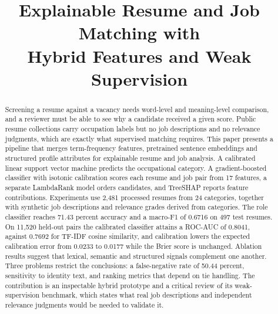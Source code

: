 \documentclass[conference]{IEEEtran}
\begin{document}
\title{Explainable Resume and Job Matching with\\Hybrid Features and Weak Supervision}

\author{
\and
{}
}

\maketitle

\begin{abstract}
Screening a resume against a vacancy needs word-level and meaning-level comparison, and a reviewer must be able to see why a candidate received a given score. Public resume collections carry occupation labels but no job descriptions and no relevance judgments, which are exactly what supervised matching requires. This paper presents a pipeline that merges term-frequency features, pretrained sentence embeddings and structured profile attributes for explainable resume and job analysis. A calibrated linear support vector machine predicts the occupational category. A gradient-boosted classifier with isotonic calibration scores each resume and job pair from 17 features, a separate LambdaRank model orders candidates, and TreeSHAP reports feature contributions. Experiments use 2,481 processed resumes from 24 categories, together with synthetic job descriptions and relevance grades derived from categories. The role classifier reaches 71.43 percent accuracy and a macro-F1 of 0.6716 on 497 test resumes. On 11,520 held-out pairs the calibrated classifier attains a ROC-AUC of 0.8041, against 0.7692 for TF-IDF cosine similarity, and calibration lowers the expected calibration error from 0.0233 to 0.0177 while the Brier score is unchanged. Ablation results suggest that lexical, semantic and structured signals complement one another. Three problems restrict the conclusions: a false-negative rate of 50.44 percent, sensitivity to identity text, and ranking metrics that depend on tie handling. The contribution is an inspectable hybrid prototype and a critical review of its weak-supervision benchmark, which states what real job descriptions and independent relevance judgments would be needed to validate it.
\end{abstract}
\end{document}
